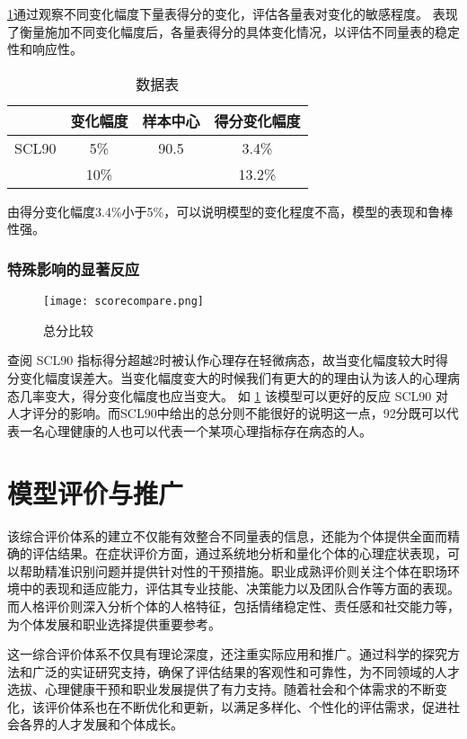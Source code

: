 \documentclass[withoutpreface,bwprint]{cumcmthesis} %
\begin{document}
\cref{tab:data}通过观察不同变化幅度下量表得分的变化，评估各量表对变化的敏感程度。
表现了衡量施加不同变化幅度后，各量表得分的具体变化情况，以评估不同量表的稳定性和响应性。
\begin{table}[h]
    \centering
    \begin{tabular}{cccc}
        \toprule
        & 变化幅度 & 样本中心 & 得分变化幅度 \\ \midrule
        SCL90 & 5\% & 90.5 & 3.4\% \\ 
              & 10\% & & 13.2\% \\ 
        \bottomrule
    \end{tabular}
    \caption{数据表}
    \label{tab:data}
\end{table}
由得分变化幅度3.4\%小于5\%，可以说明模型的变化程度不高，模型的表现和鲁棒性强。

\subsubsection{特殊影响的显著反应}

\begin{figure}[!h]
    \centering
    \texttt{[image: scorecompare.png]}
    \caption{总分比较}
    \label{fig:scorecompare}
\end{figure}

查阅 SCL90 指标得分超越2时被认作心理存在轻微病态，故当变化幅度较大时得分变化幅度误差大。当变化幅度变大的时候我们有更大的的理由认为该人的心理病态几率变大，得分变化幅度也应当变大。
如 \cref{fig:scorecompare} 该模型可以更好的反应 SCL90 对人才评分的影响。而SCL90中给出的总分则不能很好的说明这一点，92分既可以代表一名心理健康的人也可以代表一个某项心理指标存在病态的人。

\section{模型评价与推广}

该综合评价体系的建立不仅能有效整合不同量表的信息，还能为个体提供全面而精确的评估结果。在症状评价方面，通过系统地分析和量化个体的心理症状表现，可以帮助精准识别问题并提供针对性的干预措施。职业成熟评价则关注个体在职场环境中的表现和适应能力，评估其专业技能、决策能力以及团队合作等方面的表现。而人格评价则深入分析个体的人格特征，包括情绪稳定性、责任感和社交能力等，为个体发展和职业选择提供重要参考。

这一综合评价体系不仅具有理论深度，还注重实际应用和推广。通过科学的探究方法和广泛的实证研究支持，确保了评估结果的客观性和可靠性，为不同领域的人才选拔、心理健康干预和职业发展提供了有力支持。随着社会和个体需求的不断变化，该评价体系也在不断优化和更新，以满足多样化、个性化的评估需求，促进社会各界的人才发展和个体成长。
\end{document}
